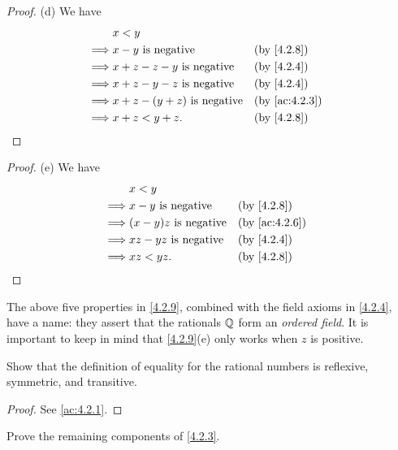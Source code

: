 \begin{proof}{(d)}
  We have
  \begin{align*}
             & x < y                                                  \\
    \implies & x - y \text{ is negative}           &  & \by{4.2.8}    \\
    \implies & x + z - z - y \text{ is negative}   &  & \by{4.2.4}    \\
    \implies & x + z - y - z \text{ is negative}   &  & \by{4.2.4}    \\
    \implies & x + z - (y + z) \text{ is negative} &  & \by{ac:4.2.3} \\
    \implies & x + z < y + z.                      &  & \by{4.2.8}
  \end{align*}
\end{proof}

\begin{proof}{(e)}
  We have
  \begin{align*}
             & x < y                                           \\
    \implies & x - y \text{ is negative}    &  & \by{4.2.8}    \\
    \implies & (x - y)z \text{ is negative} &  & \by{ac:4.2.6} \\
    \implies & xz - yz \text{ is negative}  &  & \by{4.2.4}    \\
    \implies & xz < yz.                     &  & \by{4.2.8}
  \end{align*}
\end{proof}

\begin{rmk}\label{4.2.10}
  The above five properties in \cref{4.2.9}, combined with the field axioms in \cref{4.2.4}, have a name:
  they assert that the rationals \(\mathbb{Q}\) form an \emph{ordered field}.
  It is important to keep in mind that \cref{4.2.9}(e) only works when \(z\) is positive.
\end{rmk}

\exercisesection

\begin{ex}\label{ex:4.2.1}
  Show that the definition of equality for the rational numbers is reflexive, symmetric, and transitive.
\end{ex}

\begin{proof}
  See \cref{ac:4.2.1}.
\end{proof}

\begin{ex}\label{ex:4.2.2}
  Prove the remaining components of \cref{4.2.3}.
\end{ex}

